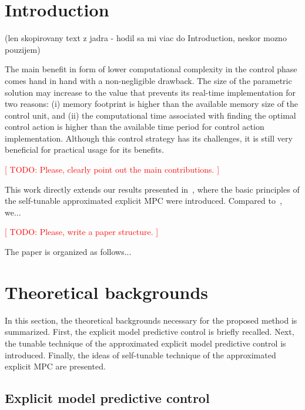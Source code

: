 \documentclass[preprint,12pt]{elsarticle}
\begin{document}

\section{Introduction}
\label{sec:introduction}
 
(len skopirovany text z jadra - hodil sa mi viac do Introduction, neskor mozno pouzijem) 

The main benefit in form of lower computational complexity in the control phase comes hand in hand with a non-negligible drawback. The size of the parametric solution may increase to the value that prevents its real-time implementation for two reasons: (i) memory footprint is higher than the available memory size of the control unit, and (ii) the computational time associated with finding the optimal control action is higher than the available time period for control action implementation. Although this control strategy has its challenges, it is still very beneficial for practical usage for its benefits. 

\textcolor{red}{[ TODO: Please, clearly point out the main contributions. ]}

This work directly extends our results presented in~\cite{self_tunable}, where the basic principles of the self-tunable approximated explicit MPC were introduced. Compared to~\cite{self_tunable}, we...

\textcolor{red}{[ TODO: Please, write a paper structure. ]}

The paper is organized as follows...

\section{Theoretical backgrounds}
\label{sec:preliminaries}

In this section, the theoretical backgrounds necessary for the proposed method is summarized. First, the explicit model predictive control is briefly recalled. Next, the tunable technique of the approximated explicit model predictive control is introduced. Finally, the ideas of self-tunable technique of the approximated explicit MPC are presented.

\subsection{Explicit model predictive control}
\label{sec:eMPC}
\end{document}
